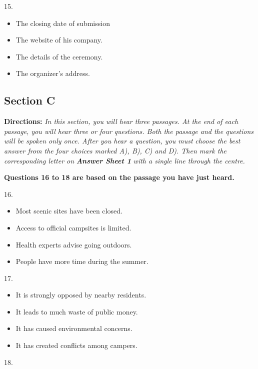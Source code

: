 \documentclass[UTF8,11pt]{ctexart}
\begin{document}
15.


\begin{itemize}[leftmargin=2em,itemsep=.2em,topsep=.4em]\item[A.] The closing date of submission
\item[B.] The website of his company.
\item[C.] The details of the ceremony.
\item[D.] The organizer’s address.
\end{itemize}

\subsection*{\textbf{Section C}}


\textbf{Directions:}\textit{ In this section, you will hear three passages. At the end of each passage, you will hear three or four} \textit{questions. Both the passage and the questions will be spoken only once. After you hear a question, you must} \textit{choose the best answer from the four choices marked A), B), C) and D). Then mark the corresponding letter on} \textbf{\textit{Answer Sheet 1}}\textit{ with a single line through the centre.}


\textbf{Questions 16 to 18 are based on the passage you have just heard.}


16.


\begin{itemize}[leftmargin=2em,itemsep=.2em,topsep=.4em]\item[A.] Most scenic sites have been closed.
\item[B.] Access to official campsites is limited.
\item[C.] Health experts advise going outdoors.
\item[D.] People have more time during the summer.
\end{itemize}

17.


\begin{itemize}[leftmargin=2em,itemsep=.2em,topsep=.4em]\item[A.] It is strongly opposed by nearby residents.
\item[B.] It leads to much waste of public money.
\item[C.] It has caused environmental concerns.
\item[D.] It has created conflicts among campers.
\end{itemize}

18.
\end{document}
